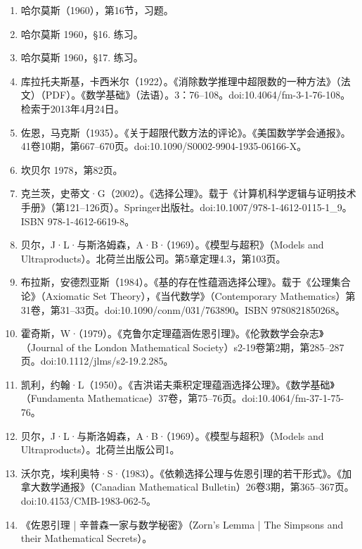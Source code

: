 \begin{enumerate}
\item 哈尔莫斯（1960），第16节，习题。
\item 哈尔莫斯 1960，§16. 练习。
\item 哈尔莫斯 1960，§17. 练习。
\item 库拉托夫斯基，卡西米尔（1922）。《消除数学推理中超限数的一种方法》（法文）（PDF）。《数学基础》（法语）。3：76–108。doi:10.4064/fm-3-1-76-108。检索于2013年4月24日。
\item 佐恩，马克斯（1935）。《关于超限代数方法的评论》。《美国数学学会通报》。41卷10期，第667–670页。doi:10.1090/S0002-9904-1935-06166-X。
\item 坎贝尔 1978，第82页。
\item 克兰茨，史蒂文·G（2002）。《选择公理》。载于《计算机科学逻辑与证明技术手册》（第121–126页）。Springer出版社。doi:10.1007/978-1-4612-0115-1_9。ISBN 978-1-4612-6619-8。
\item 贝尔，J·L·与斯洛姆森，A·B·（1969）。《模型与超积》（Models and Ultraproducts）。北荷兰出版公司。第5章定理4.3，第103页。
\item 布拉斯，安德烈亚斯（1984）。《基的存在性蕴涵选择公理》。载于《公理集合论》（Axiomatic Set Theory），《当代数学》（Contemporary Mathematics）第31卷，第31–33页。doi:10.1090/conm/031/763890。ISBN 9780821850268。
\item 霍奇斯，W·（1979）。《克鲁尔定理蕴涵佐恩引理》。《伦敦数学会杂志》（Journal of the London Mathematical Society）s2-19卷第2期，第285–287页。doi:10.1112/jlms/s2-19.2.285。
\item 凯利，约翰·L（1950）。《吉洪诺夫乘积定理蕴涵选择公理》。《数学基础》（Fundamenta Mathematicae）37卷，第75–76页。doi:10.4064/fm-37-1-75-76。
\item 贝尔，J·L·与斯洛姆森，A·B·（1969）。《模型与超积》（Models and Ultraproducts）。北荷兰出版公司1。
\item 沃尔克，埃利奥特·S·（1983）。《依赖选择公理与佐恩引理的若干形式》。《加拿大数学通报》（Canadian Mathematical Bulletin）26卷3期，第365–367页。doi:10.4153/CMB-1983-062-5。
\item 《佐恩引理 | 辛普森一家与数学秘密》（Zorn's Lemma | The Simpsons and their Mathematical Secrets）。
\end{enumerate}